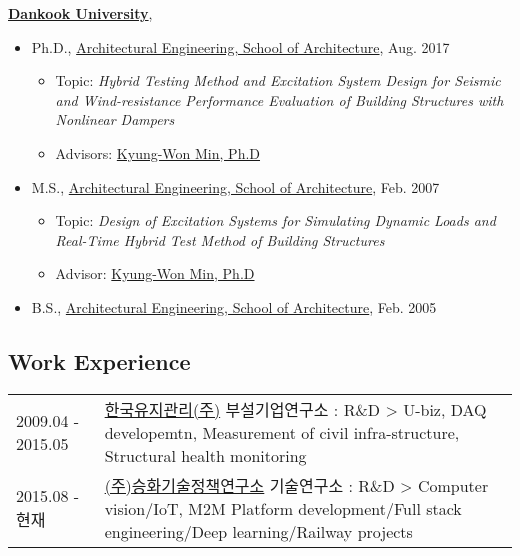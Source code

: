 \href{http://www.dankook.ac.kr/}{\textbf{Dankook University}},
\begin{itemize}
\item[] Ph.D.,
        \href{http://cms.dankook.ac.kr/web/archi}
             {Architectural Engineering, School of Architecture},
             Aug. 2017
        \begin{itemize}
        \item Topic: \emph{Hybrid Testing Method and Excitation System Design for Seismic and Wind-resistance Performance Evaluation of Building Structures with Nonlinear Dampers}
        \item Advisors:
              \href{http://cms.dankook.ac.kr/web/archi/-16?p_p_id=DeptInfo_WAR_empInfoportlet&p_p_lifecycle=0&p_p_state=normal&p_p_mode=view&p_p_col_id=column-2&p_p_col_count=1&_DeptInfo_WAR_empInfoportlet_empId=2zEyEnhbhLlys2HRljBFWg%3D%3D&_DeptInfo_WAR_empInfoportlet_action=view_message}
                   {Kyung-Won Min, Ph.D}
        \end{itemize}

\item[] M.S.,
        \href{http://cms.dankook.ac.kr/web/archi}
             {Architectural Engineering, School of Architecture},
             Feb. 2007
        \begin{itemize}
        \item Topic: \emph{Design of Excitation Systems for Simulating Dynamic Loads and Real-Time Hybrid Test Method of Building Structures}
        \item Advisor:
              \href{http://cms.dankook.ac.kr/web/archi/-16?p_p_id=DeptInfo_WAR_empInfoportlet&p_p_lifecycle=0&p_p_state=normal&p_p_mode=view&p_p_col_id=column-2&p_p_col_count=1&_DeptInfo_WAR_empInfoportlet_empId=2zEyEnhbhLlys2HRljBFWg%3D%3D&_DeptInfo_WAR_empInfoportlet_action=view_message}
                   {Kyung-Won Min, Ph.D}
        \end{itemize}
\item[] B.S.,
        \href{http://cms.dankook.ac.kr/web/archi}
             {Architectural Engineering, School of Architecture},
             Feb. 2005
\end{itemize}

\subsection*{Work Experience}

\begin{tabularx}{\textwidth}{@{}p{}X@{}}
2009.04 - 2015.05 & \href{http://www.kmbest.co.kr/}{한국유지관리(주)} 
부설기업연구소 : R\&D \textgreater{} U-biz, DAQ developemtn, Measurement of civil infra-structure, Structural health monitoring\\
2015.08 - 현재 & \href{http://www.shtpi.co.kr/}{(주)승화기술정책연구소}
 기술연구소 : R\&D \textgreater{} Computer vision/IoT, M2M Platform development/Full stack engineering/Deep learning/Railway projects\\
\end{tabularx}



